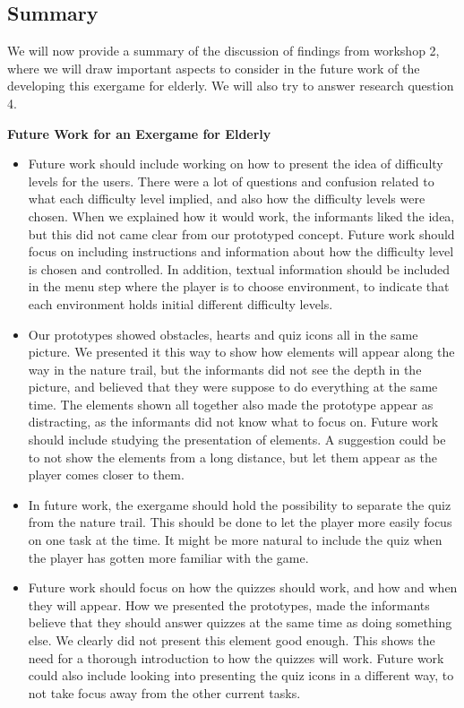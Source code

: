 \subsection{Summary}
We will now provide a summary of the discussion of findings from workshop 2, where we will draw important aspects to consider in the future work of the developing this exergame for elderly. We will also try to answer research question 4.

\textbf{Future Work for an Exergame for Elderly}
\begin{itemize}
\renewcommand{\labelitemi}{$\bullet$}
\item Future work should include working on how to present the idea of difficulty levels for the users. There were a lot of questions and confusion related to what each difficulty level implied, and also how the difficulty levels were chosen. When we explained how it would work, the informants liked the idea, but this did not came clear from our prototyped concept. Future work should focus on including instructions and information about how the difficulty level is chosen and controlled. In addition, textual information should be included in the menu step where the player is to choose environment, to indicate that each environment holds initial different difficulty levels.  
\item Our prototypes showed obstacles, hearts and quiz icons all in the same picture. We presented it this way to show how elements will appear along the way in the nature trail, but the informants did not see the depth in the picture, and believed that they were suppose to do everything at the same time. The elements shown all together also made the prototype appear as distracting, as the informants did not know what to focus on. Future work should include studying the presentation of elements. A suggestion could be to not show the elements from a long distance, but let them appear as the player comes closer to them. 
\item In future work, the exergame should hold the possibility to separate the quiz from the nature trail. This should be done to let the player more easily focus on one task at the time. It might be more natural to include the quiz when the player has gotten more familiar with the game.
\item Future work should focus on how the quizzes should work, and how and when they will appear. How we presented the prototypes, made the informants believe that they should answer quizzes at the same time as doing something else. We clearly did not present this element good enough. This shows the need for a thorough introduction to how the quizzes will work. Future work could also include looking into presenting the quiz icons in a different way, to not take focus away from the other current tasks. 

\end{itemize}
